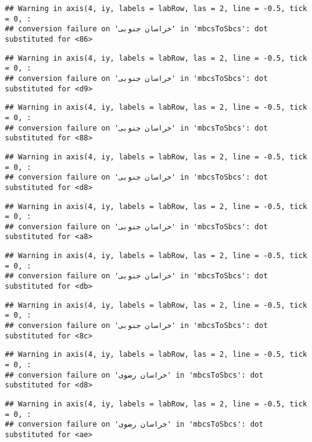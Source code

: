\documentclass[
]{article}
\begin{document}
\begin{verbatim}
## Warning in axis(4, iy, labels = labRow, las = 2, line = -0.5, tick = 0, :
## conversion failure on 'خراسان جنوبی' in 'mbcsToSbcs': dot substituted for <86>
\end{verbatim}

\begin{verbatim}
## Warning in axis(4, iy, labels = labRow, las = 2, line = -0.5, tick = 0, :
## conversion failure on 'خراسان جنوبی' in 'mbcsToSbcs': dot substituted for <d9>
\end{verbatim}

\begin{verbatim}
## Warning in axis(4, iy, labels = labRow, las = 2, line = -0.5, tick = 0, :
## conversion failure on 'خراسان جنوبی' in 'mbcsToSbcs': dot substituted for <88>
\end{verbatim}

\begin{verbatim}
## Warning in axis(4, iy, labels = labRow, las = 2, line = -0.5, tick = 0, :
## conversion failure on 'خراسان جنوبی' in 'mbcsToSbcs': dot substituted for <d8>
\end{verbatim}

\begin{verbatim}
## Warning in axis(4, iy, labels = labRow, las = 2, line = -0.5, tick = 0, :
## conversion failure on 'خراسان جنوبی' in 'mbcsToSbcs': dot substituted for <a8>
\end{verbatim}

\begin{verbatim}
## Warning in axis(4, iy, labels = labRow, las = 2, line = -0.5, tick = 0, :
## conversion failure on 'خراسان جنوبی' in 'mbcsToSbcs': dot substituted for <db>
\end{verbatim}

\begin{verbatim}
## Warning in axis(4, iy, labels = labRow, las = 2, line = -0.5, tick = 0, :
## conversion failure on 'خراسان جنوبی' in 'mbcsToSbcs': dot substituted for <8c>
\end{verbatim}

\begin{verbatim}
## Warning in axis(4, iy, labels = labRow, las = 2, line = -0.5, tick = 0, :
## conversion failure on 'خراسان رضوی' in 'mbcsToSbcs': dot substituted for <d8>
\end{verbatim}

\begin{verbatim}
## Warning in axis(4, iy, labels = labRow, las = 2, line = -0.5, tick = 0, :
## conversion failure on 'خراسان رضوی' in 'mbcsToSbcs': dot substituted for <ae>
\end{verbatim}
\end{document}
